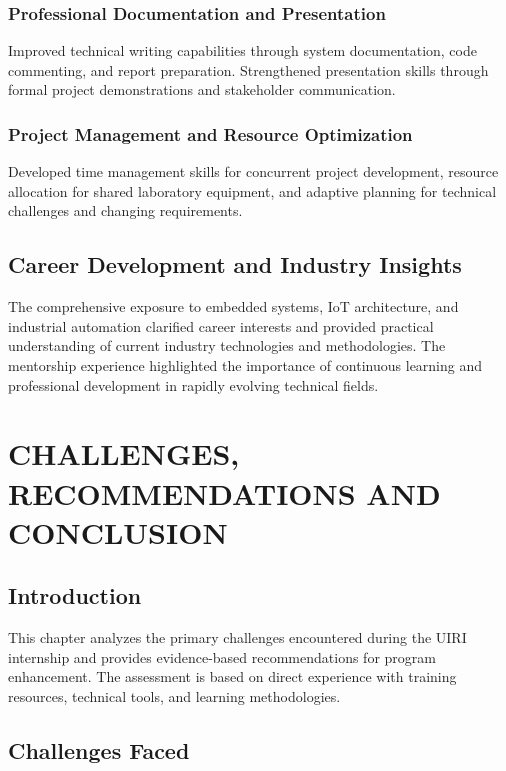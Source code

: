\documentclass[12pt,a4paper]{report}
\begin{document}
\subsection{Professional Documentation and Presentation}
\noindent Improved technical writing capabilities through system documentation, code commenting, and report preparation. Strengthened presentation skills through formal project demonstrations and stakeholder communication.

\subsection{Project Management and Resource Optimization}
\noindent Developed time management skills for concurrent project development, resource allocation for shared laboratory equipment, and adaptive planning for technical challenges and changing requirements.

\section{Career Development and Industry Insights}

\noindent The comprehensive exposure to embedded systems, IoT architecture, and industrial automation clarified career interests and provided practical understanding of current industry technologies and methodologies. The mentorship experience highlighted the importance of continuous learning and professional development in rapidly evolving technical fields.

\newpage
\chapter{CHALLENGES, RECOMMENDATIONS AND CONCLUSION}

\section{Introduction}

\noindent This chapter analyzes the primary challenges encountered during the UIRI internship and provides evidence-based recommendations for program enhancement. The assessment is based on direct experience with training resources, technical tools, and learning methodologies.

\section{Challenges Faced}
\end{document}
